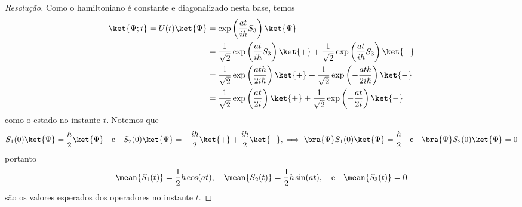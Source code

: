 \begin{proof}[Resolução]
    Como o hamiltoniano é constante e diagonalizado nesta base, temos
    \begin{align*}
        \ket{\Psi; t} = U(t) \ket{\Psi} &= \exp\left(\frac{at}{i\hbar}S_3\right) \ket{\Psi}\\
                                        &= \frac{1}{\sqrt{2}}\exp\left(\frac{at}{i\hbar}S_3\right)\ket{+} + \frac{1}{\sqrt{2}}\exp\left(\frac{at}{i\hbar}S_3\right)\ket{-}\\
                                        &= \frac{1}{\sqrt{2}} \exp\left(\frac{at \hbar}{2i \hbar} \right) \ket{+} + \frac{1}{\sqrt{2}} \exp\left(-\frac{at \hbar}{2i \hbar} \right) \ket{-}\\
                                        &= \frac{1}{\sqrt{2}} \exp\left(\frac{at}{2i}\right) \ket{+} + \frac{1}{\sqrt{2}} \exp\left(-\frac{at}{2i} \right) \ket{-}
    \end{align*}
    como o estado no instante \(t\). Notemos que
    \begin{equation*}
        S_1(0)\ket{\Psi} = \frac{\hbar}{2}\ket{\Psi}
        \quad\text{e}\quad
        S_2(0) \ket{\Psi} = -\frac{i\hbar}{2}\ket{+} + \frac{i \hbar}{2} \ket{-},
        \implies
        \bra{\Psi}S_1(0)\ket{\Psi} = \frac{\hbar}{2}
        \quad\text{e}\quad
        \bra{\Psi}S_2(0) \ket{\Psi} = 0
    \end{equation*}
    portanto
    \begin{equation*}
        \mean{S_1(t)} = \frac12 \hbar \cos(at),
        \quad
        \mean{S_2(t)} = \frac12 \hbar \sin(at),
        \quad\text{e}\quad
        \mean{S_3(t)} = 0
    \end{equation*}
    são os valores esperados dos operadores no instante \(t\).
\end{proof}
